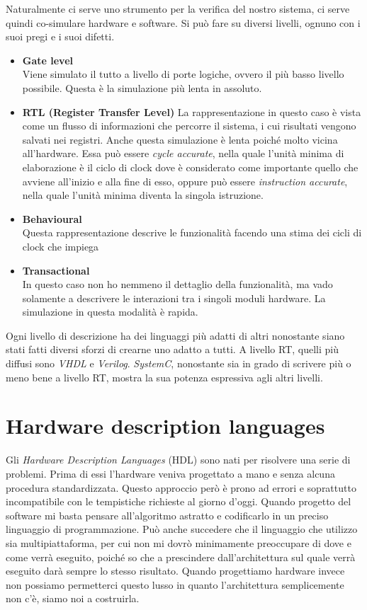 \documentclass[10pt,a4paper,oneside]{scrbook}
\begin{document}
Naturalmente ci serve uno strumento per la verifica del nostro sistema, ci serve quindi co-simulare hardware e software.
Si può fare su diversi livelli, ognuno con i suoi pregi e i suoi difetti.
\begin{itemize}
	\item \textbf{Gate level}\\
	Viene simulato il tutto a livello di porte logiche, ovvero il più basso livello
	possibile. Questa è la simulazione più lenta in assoluto.
	\item \textbf{RTL (Register Transfer Level)}
	La rappresentazione in questo caso è vista come un flusso di informazioni che
	percorre il sistema, i cui risultati vengono salvati nei registri. Anche questa
	simulazione è lenta poiché molto vicina all'hardware.
	Essa può essere \textit{cycle accurate}, nella quale l'unità minima di elaborazione è il ciclo
	di clock dove è considerato come importante quello che avviene all'inizio e alla fine di esso,
	oppure può essere \textit{instruction accurate}, nella quale l'unità minima diventa la singola istruzione.
	\item \textbf{Behavioural}\\
	Questa rappresentazione descrive le funzionalità facendo una stima dei cicli di clock che impiega
	\item \textbf{Transactional}\\
	In questo caso non ho nemmeno il dettaglio della funzionalità, ma vado solamente a descrivere
	le interazioni tra i singoli moduli hardware. La simulazione in questa modalità è rapida.
\end{itemize}

Ogni livello di descrizione ha dei linguaggi più adatti di altri nonostante siano stati fatti diversi
sforzi di crearne uno adatto a tutti.
A livello RT, quelli più diffusi sono \textit{VHDL} e \textit{Verilog}.
\textit{SystemC}, nonostante sia in grado di scrivere più o meno bene a livello RT, mostra la sua
potenza espressiva agli altri livelli.

\section{Hardware description languages}
Gli \textit{Hardware Description Languages} (HDL) sono nati per risolvere una serie di problemi.
Prima di essi l'hardware veniva progettato a mano e senza alcuna procedura standardizzata. Questo
approccio però è prono ad errori e soprattutto incompatibile con le tempistiche richieste al giorno d'oggi.
Quando progetto del software mi basta pensare all'algoritmo astratto e codificarlo in un preciso linguaggio
di programmazione. Può anche succedere che il linguaggio che utilizzo sia multipiattaforma, per cui non mi dovrò
minimamente preoccupare di dove e come verrà eseguito, poiché so che a prescindere dall'architettura sul quale
verrà eseguito darà sempre lo stesso risultato.
Quando progettiamo hardware invece non possiamo permetterci questo lusso in quanto l'architettura semplicemente
non c'è, siamo noi a costruirla.
\end{document}
